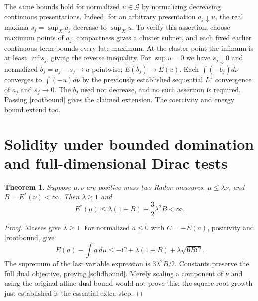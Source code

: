 \documentclass[11pt]{article}
\newtheorem{theorem}{Theorem}
\newcommand{\G}{\mathcal G}
\begin{document}
The same bounds hold for normalized $u\in\G$ by normalizing decreasing
continuous presentations. Indeed, for an arbitrary presentation
$a_j\downarrow u$, the real maxima $s_j=\sup_Xa_j$ decrease to
$\sup_Xu$. To verify this assertion, choose maximum points of $a_j$;
compactness gives a cluster subnet, and each fixed earlier continuous
term bounds every late maximum. At the cluster point the infimum is
at least $\inf s_j$, giving the reverse inequality. For $\sup u=0$
we have $s_j\downarrow0$ and normalized $b_j=a_j-s_j\to u$
pointwise; $E(b_j)\to E(u)$. Each $\int(-b_j)d\nu$ converges to
$\int(-u)d\nu$ by the previously established sequential $L^1$
convergence of $a_j$ and $s_j\to0$. The $b_j$ need not decrease,
and no such assertion is required. Passing \eqref{rootbound} gives
the claimed extension. The coercivity and energy bound extend too.

\section{Solidity under bounded domination and full-dimensional Dirac tests}
\begin{theorem}\label{solid}
Suppose $\mu,\nu$ are positive mass-two Radon measures,
$\mu\le\lambda\nu$, and $B=E^*(\nu)<\infty$.
Then $\lambda\ge1$ and
\begin{equation}\label{solidbound}
 E^*(\mu)\le\lambda(1+B)+\frac32\lambda^2B<\infty.
\end{equation}
\end{theorem}
\begin{proof}
Masses give $\lambda\ge1$. For normalized $a\le0$ with
$C=-E(a)$, positivity and \eqref{rootbound} give
\[
 E(a)-\int a\,d\mu
 \le-C+\lambda(1+B)+\lambda\sqrt{6BC}.
\]
The supremum of the last variable expression is $3\lambda^2B/2$.
Constants preserve the full dual objective, proving
\eqref{solidbound}. Merely scaling a component of $\nu$ and using
the original affine dual bound would not prove this: the square-root
growth just established is the essential extra step.
\end{proof}
\end{document}
